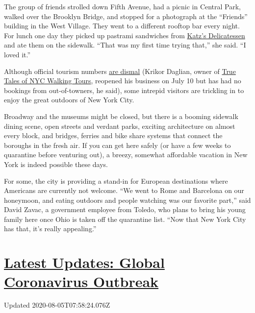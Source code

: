 The group of friends strolled down Fifth Avenue, had a picnic in Central
Park, walked over the Brooklyn Bridge, and stopped for a photograph at
the ``Friends'' building in the West Village. They went to a different
rooftop bar every night. For lunch one day they picked up pastrami
sandwiches from \href{https://katzsdelicatessen.com/}{Katz's
Delicatessen} and ate them on the sidewalk. ``That was my first time
trying that,'' she said. ``I loved it.''

Although official tourism numbers
\href{https://www.nytimes3xbfgragh.onion/2020/07/24/nyregion/nyc-tourism-coronavirus.html}{are
dismal} (Krikor Daglian, owner of
\href{http://www.truetalesnyc.com/}{True Tales of NYC Walking Tours},
reopened his business on July 10 but has had no bookings from
out-of-towners, he said), some intrepid visitors are trickling in to
enjoy the great outdoors of New York City.

Broadway and the museums might be closed, but there is a booming
sidewalk dining scene, open streets and verdant parks, exciting
architecture on almost every block, and bridges, ferries and bike share
systems that connect the boroughs in the fresh air. If you can get here
safely (or have a few weeks to quarantine before venturing out), a
breezy, somewhat affordable vacation in New York is indeed possible
these days.

For some, the city is providing a stand-in for European destinations
where Americans are currently not welcome. ``We went to Rome and
Barcelona on our honeymoon, and eating outdoors and people watching was
our favorite part,'' said David Zavac, a government employee from
Toledo, who plans to bring his young family here once Ohio is taken off
the quarantine list. ``Now that New York City has that, it's really
appealing.''

\hypertarget{latest-updates-global-coronavirus-outbreak}{%
\section{\texorpdfstring{\href{https://www.nytimes3xbfgragh.onion/2020/08/04/world/coronavirus-cases.html?action=click\&pgtype=Article\&state=default\&region=MAIN_CONTENT_1\&context=storylines_live_updates}{Latest
Updates: Global Coronavirus
Outbreak}}{Latest Updates: Global Coronavirus Outbreak}}\label{latest-updates-global-coronavirus-outbreak}}

Updated 2020-08-05T07:58:24.076Z

